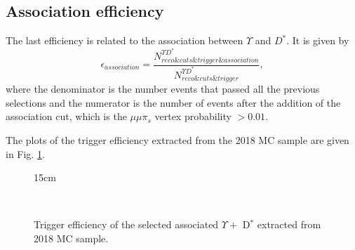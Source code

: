 \subsection{Association efficiency}

The last efficiency is related to the association between $\Upsilon$ and $D^*$. It is given by
\begin{equation}
  \epsilon_{association} = 
  \frac{N_{reco\&cuts\&trigger\&association}^{\Upsilon D^*}}{N_{reco\&cuts\&trigger}^{\Upsilon D^*}},
\end{equation}
where the denominator is the number events that passed all the previous selections and the numerator is the number of events after the addition of the association cut, which is the $\mu\mu\pi_s$ vertex probability $> 0.01$.

The plots of the trigger efficiency extracted from the 2018 MC sample are given in Fig. \ref{fig:eff_asso}.

\begin{figure}[!htm]{15cm}
  \caption{Trigger efficiency of the selected associated $\Upsilon +$ D$^*$ extracted from 2018 MC sample.} 
  \label{fig:eff_asso}
  \hfill
  \hfill\\
\end{figure}


